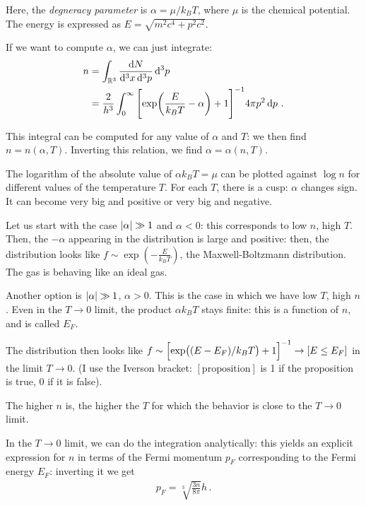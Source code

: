 \documentclass[main.tex]{subfiles}
\begin{document}
Here, the \emph{degneracy parameter} is \(\alpha = \mu / k_B T\), where \(\mu  \) is the chemical potential. 
The energy is expressed as \(E = \sqrt{m^2 c^{4} + p^2 c^2}\).

If we want to compute \(\alpha \), we can just integrate: 
%
\begin{align}
n &= \int_{\mathbb{R}^3} \frac{ \dd{N}}{ \dd[3]{x} \dd[3]{p}} \dd[3]{p}  \\
&= \frac{2}{h^3} \int_0^{\infty } 
\qty[\exp(\frac{E }{k_B T} - \alpha ) + 1]^{-1} 4 \pi p^2 \dd{p}
\,.
\end{align}

This integral can be computed for any value of \(\alpha \) and \(T\): we then find \(n = n(\alpha , T)\). Inverting this relation, we find \(\alpha = \alpha (n, T)\). 

The logarithm of the absolute value of \(\alpha k_B T = \mu \) can be plotted against \(\log n\) for different values of the temperature \(T\). For each \(T\), there is a cusp: \(\alpha \) changes sign. It can become very big and positive or very big and negative. 


Let us start with the case \(\abs{\alpha } \gg 1 \) and \(\alpha < 0\): this corresponds to low \(n\), high \(T\). 
Then, the \(- \alpha \) appearing in the distribution is large and positive: then, the distribution looks like \(f \sim \exp(- \frac{E}{k_B T})\), the Maxwell-Boltzmann distribution. 
The gas is behaving like an ideal gas. 

Another option is \(\abs{\alpha } \gg 1\), \(\alpha > 0\). This is the case in which we have low \(T\), high \(n\). Even in the \(T \to 0\) limit, the product \(\alpha k_B T \) stays finite: this is a function of \(n\), and is called \(E _F\).

The distribution then looks like \(f \sim \qty[\exp( (E - E_F) / k_B T) + 1]^{-1} \to [E \leq E_F]\) in the limit \(T \to 0\).
(I use the Iverson bracket: \([\text{proposition}]\) is 1 if the proposition is true, 0 if it is false).  

The higher \(n\) is, the higher the \(T\) for which the behavior is close to the \(T \to 0\) limit. 

In the \(T \to 0\) limit, we can do the integration analytically: this yields an explicit expression for \(n\) in terms of the Fermi momentum \(p_F\) corresponding to the Fermi energy \(E_F\): inverting it we get
%
\begin{align}
p_F = \sqrt[3]{\frac{3n }{8 \pi }} h
\,.
\end{align}
\end{document}

